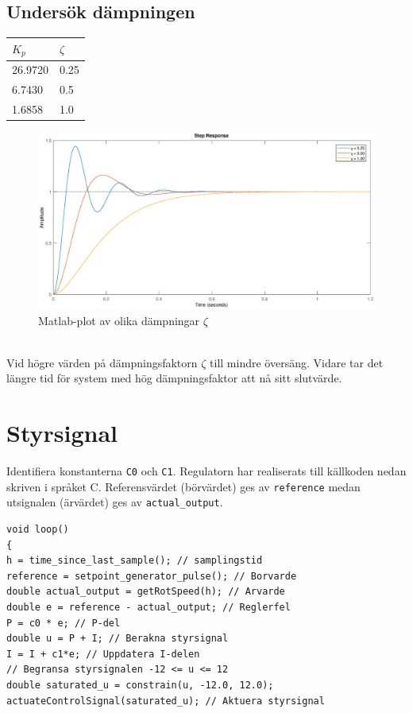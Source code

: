 \documentclass[11pt]{article}
\begin{document}
\subsection{Undersök dämpningen}
\begin{tabular}{|l|l|}
\hline
$K_p$&$\zeta$ \hspace*{1em} \\ \hline \hline 
26.9720 & 0.25 \\ \hline
6.7430&0.5\\ \hline
1.6858&1.0\\ \hline
\end{tabular}
\begin{figure}[h!]
\centering
\includegraphics[scale=0.45]{Figures/plot2}
\caption{Matlab-plot av olika dämpningar $\zeta$}
\end{figure}\\[1em]
Vid högre värden på dämpningsfaktorn $\zeta$ till mindre översäng. Vidare tar det längre tid för system med hög dämpningsfaktor att nå sitt slutvärde.

\section{Styrsignal}
Identifiera konstanterna \texttt{C0} och \texttt{C1}. Regulatorn har realiserats till källkoden nedan skriven i språket C. Referensvärdet (börvärdet) ges av \texttt{reference} medan utsignalen (ärvärdet) ges av \texttt{actual\_output}.

\begin{lstlisting}[frame=single]
void loop()
{
h = time_since_last_sample(); // samplingstid
reference = setpoint_generator_pulse(); // Borvarde
double actual_output = getRotSpeed(h); // Arvarde
double e = reference - actual_output; // Reglerfel
P = c0 * e; // P-del
double u = P + I; // Berakna styrsignal
I = I + c1*e; // Uppdatera I-delen
// Begransa styrsignalen -12 <= u <= 12
double saturated_u = constrain(u, -12.0, 12.0);
actuateControlSignal(saturated_u); // Aktuera styrsignal
\end{lstlisting} 
\vspace*{1em}
\end{document}
